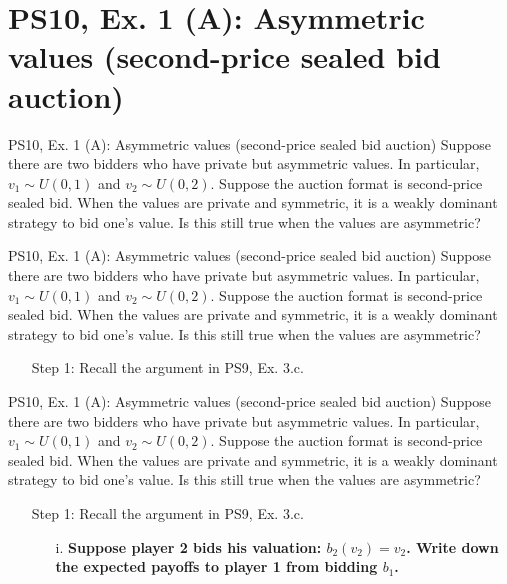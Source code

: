\section{PS10, Ex. 1 (A): Asymmetric values (second-price sealed bid auction)}

\begin{frame}{PS10, Ex. 1 (A): Asymmetric values (second-price sealed bid auction)}
    Suppose there are two bidders who have private but asymmetric values. In particular, $v_1\sim U(0, 1)$ and $v_2\sim U(0, 2)$. Suppose the auction format is second-price sealed bid. When the values are private and symmetric, it is a weakly dominant strategy to bid one’s value. Is this still true when the values are asymmetric?
    \vfill\null
\end{frame}

\begin{frame}{PS10, Ex. 1 (A): Asymmetric values (second-price sealed bid auction)}
    Suppose there are two bidders who have private but asymmetric values. In particular, $v_1\sim U(0, 1)$ and $v_2\sim U(0, 2)$. Suppose the auction format is second-price sealed bid. When the values are private and symmetric, it is a weakly dominant strategy to bid one’s value. Is this still true when the values are asymmetric?
    \begin{multicols}{2}
      \begin{itemize}
        \item[Step 1:] Recall the argument in PS9, Ex. 3.c.
      \end{itemize}
      \vfill\null\columnbreak
      \vfill\null
    \end{multicols}
\end{frame}
\begin{frame}{PS10, Ex. 1 (A): Asymmetric values (second-price sealed bid auction)}
    Suppose there are two bidders who have private but asymmetric values. In particular, $v_1\sim U(0, 1)$ and $v_2\sim U(0, 2)$. Suppose the auction format is second-price sealed bid. When the values are private and symmetric, it is a weakly dominant strategy to bid one’s value. Is this still true when the values are asymmetric?
    \begin{multicols}{2}
      \begin{itemize}
        \item[Step 1:] Recall the argument in PS9, Ex. 3.c.
        \begin{itemize}\normalsize
          \item[i.]   \textbf{Suppose player 2 bids his valuation: $b_2(v_2) = v_2$. Write down the expected payoffs to player 1 from bidding $b_1$.}
        \end{itemize}
      \end{itemize}
      \vfill\null\columnbreak
      \vfill\null
    \end{multicols}
\end{frame}

